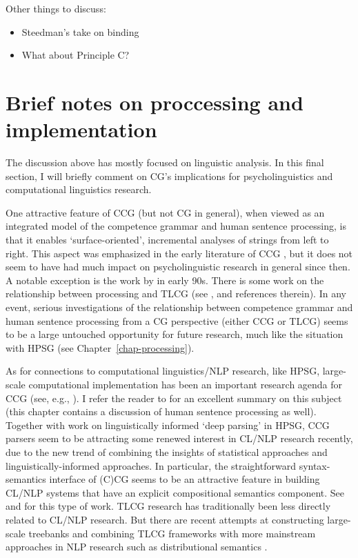 \documentclass[output=paper]{langsci/langscibook}
\begin{document}

\noindent
Other things to discuss:

\begin{itemize}
 \item Steedman's take on binding
 \item What about Principle C?
\end{itemize}


\section{Brief notes on proccessing and implementation}

The discussion above has mostly focused on linguistic analysis. In
this final section, I will briefly comment on CG's implications for
psycholinguistics and computational linguistics research.

One attractive feature of CCG (but not CG in general), when viewed as
an integrated model of the competence grammar and human sentence
processing, is that it enables `surface-oriented', incremental
analyses of strings from left to right. This aspect was emphasized in
the early literature of CCG \citep{AS82a,CS85a}, but it does not seem to
have had much impact on psycholinguistic research in general since
then. A notable exception is the work by \citet{pickering-barry91,PB93a} in
early 90s. There is some work on the relationship between processing
and TLCG (see \cite[Chapters 9 and 10]{morrill2011}, and references
therein). In any event, serious investigations of the relationship
between competence grammar and human sentence processing from a CG
perspective (either CCG or TLCG) seems to be a large untouched
opportunity for future research, much like the situation with HPSG
(see Chapter~\ref{chap-processing}).

As for connections to computational linguistics/NLP research, like
HPSG, large-scale computational implementation has been an important
research agenda for CCG (see, e.g., \citet{CC2007a-u}). I refer
the reader to \cite[Chapter 13]{steedman2012} for an excellent
summary on this subject (this chapter contains a discussion of human
sentence processing as well). Together with work on linguistically
informed `deep parsing' in HPSG, CCG parsers seem to be attracting
some renewed interest in CL/NLP research recently, due to the new trend of
combining the insights of statistical approaches and
linguistically-informed approaches. In particular, the straightforward
syntax-semantics interface of (C)CG seems to be an attractive feature
in building CL/NLP systems that have an explicit compositional
semantics component. See \citet{steedmanlewis13} and \citet{mineshima-etal:2016:emnlp}
for this type of work. TLCG research has traditionally been less
directly related to CL/NLP research. But there are recent attempts at
constructing large-scale treebanks \citep{moot2015} and combining TLCG
frameworks with more mainstream approaches in NLP research such as
distributional semantics \citep{moot2018}.
\end{document}
